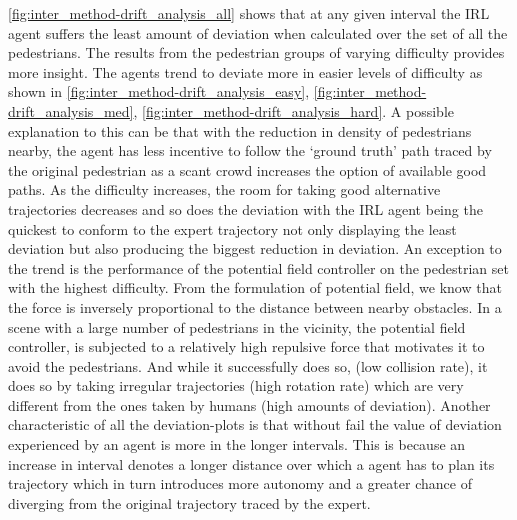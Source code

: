 \autoref{fig:inter_method-drift_analysis_all} shows that at any given interval the IRL agent suffers the least amount of deviation when calculated over the set of all the pedestrians. The results from the pedestrian groups of varying difficulty provides more insight. The agents trend to deviate more in easier levels of difficulty as shown in \autoref{fig:inter_method-drift_analysis_easy}, \autoref{fig:inter_method-drift_analysis_med}, \autoref{fig:inter_method-drift_analysis_hard}. A possible explanation to this can be that with the reduction in density of pedestrians nearby, the agent has less incentive to follow the `ground truth' path traced by the original pedestrian as a scant crowd increases the option of available good paths. As the difficulty increases, the room for taking good alternative trajectories decreases and so does the deviation with the IRL agent being the quickest to conform to the expert trajectory not only displaying the least deviation but also producing the biggest reduction in deviation. An exception to the trend is the performance of the potential field controller on the pedestrian set with the highest difficulty. From the formulation of potential field, we know that the force is inversely proportional to the distance between nearby obstacles. In a scene with a large number of pedestrians in the vicinity, the potential field controller, is subjected to a relatively high repulsive force that motivates it to avoid the pedestrians. And while it successfully does so, (low collision rate), it does so by taking irregular trajectories (high rotation rate) which are very different from the ones taken by humans (high amounts of deviation). Another characteristic of all the deviation-plots is that without fail the value of deviation experienced by an agent is more in the longer intervals. This is because an increase in interval denotes a longer distance over which a agent has to plan its trajectory which in turn introduces more autonomy and a greater chance of diverging from the original trajectory traced by the expert.

